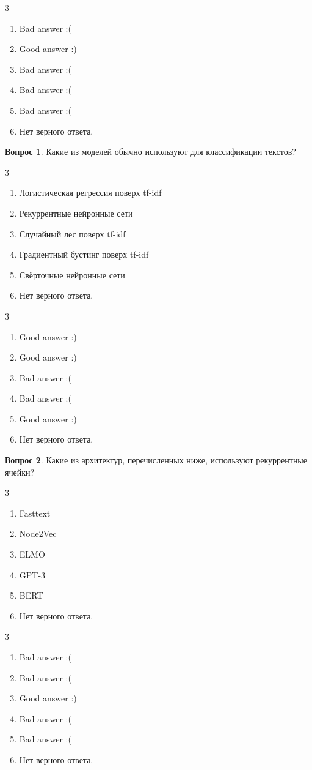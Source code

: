 \documentclass[12pt]{article}
\newenvironment{answerlist}[1][3]{
\begin{multicols}{#1}

\begin{enumerate}[label=\fbox{\emph{\Alph*}},ref=\emph{\alph*}]
}
{
\item Нет верного ответа.
\end{enumerate}
\end{multicols}
}
\theoremstyle{definition}
\newtheorem{question}{Вопрос}
\begin{document}
\begin{solution}
\begin{answerlist}
  \item Bad answer :(
  \item Good answer :)
  \item Bad answer :(
  \item Bad answer :(
  \item Bad answer :(
\end{answerlist}
\end{solution}


\begin{question}
Какие из моделей обычно используют для классификации текстов? 
\begin{answerlist}
  \item  Логистическая регрессия поверх tf-idf
  \item  Рекуррентные нейронные сети
  \item  Случайный лес поверх tf-idf
  \item  Градиентный бустинг поверх tf-idf
  \item  Свёрточные нейронные сети
\end{answerlist}
\end{question}

\begin{solution}
\begin{answerlist}
  \item Good answer :)
  \item Good answer :)
  \item Bad answer :(
  \item Bad answer :(
  \item Good answer :)
\end{answerlist}
\end{solution}


\begin{question}
Какие из архитектур, перечисленных ниже, используют рекуррентные ячейки? 
\begin{answerlist}
  \item Fasttext
  \item Node2Vec
  \item ELMO
  \item GPT-3
  \item BERT
\end{answerlist}
\end{question}

\begin{solution}
\begin{answerlist}
  \item Bad answer :(
  \item Bad answer :(
  \item Good answer :)
  \item Bad answer :(
  \item Bad answer :(
\end{answerlist}
\end{solution}
\end{document}
